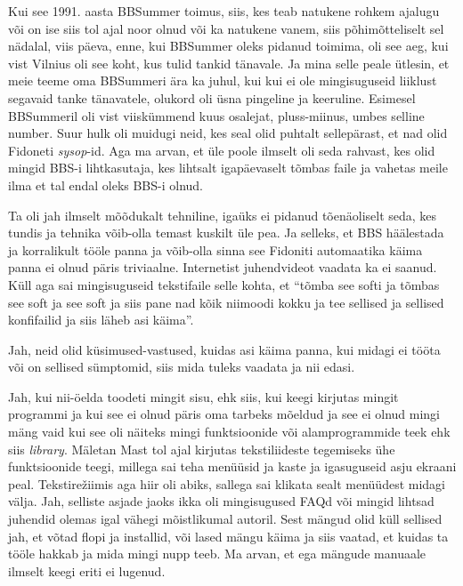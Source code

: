 Kui see 1991. aasta BBSummer toimus, siis, kes teab natukene rohkem ajalugu või on ise siis tol ajal noor olnud või ka natukene vanem, siis põhimõtteliselt sel nädalal,  viis päeva, enne, kui BBSummer oleks pidanud toimima, oli see aeg, kui vist Vilnius oli see koht, kus tulid tankid tänavale. Ja mina selle peale ütlesin, et  meie teeme oma BBSummeri ära ka juhul, kui kui ei ole mingisuguseid liiklust segavaid tanke tänavatele, olukord oli üsna pingeline ja keeruline. Esimesel BBSummeril oli vist viiskümmend kuus osalejat, pluss-miinus, umbes selline number. Suur hulk oli muidugi neid, kes seal olid puhtalt  sellepärast, et nad olid Fidoneti \emph{sysop}-id. Aga ma arvan, et  üle poole ilmselt oli seda rahvast, kes  olid mingid BBS-i lihtkasutaja, kes lihtsalt igapäevaselt tõmbas faile ja vahetas meile ilma et tal endal oleks BBS-i olnud.


Ta oli jah ilmselt mõõdukalt tehniline, igaüks ei pidanud tõenäoliselt seda, kes tundis ja tehnika võib-olla temast kuskilt üle pea. Ja selleks, et BBS häälestada ja korralikult tööle panna ja võib-olla sinna see Fidoniti automaatika käima panna  ei olnud päris triviaalne. Internetist juhendvideot vaadata ka ei saanud. Küll aga sai mingisuguseid tekstifaile  selle kohta, et \enquote{tõmba see softi ja tõmbas see soft ja see soft ja siis pane nad kõik niimoodi kokku ja  tee sellised ja sellised konfifailid ja siis läheb asi käima}.


Jah, neid  olid küsimused-vastused, kuidas asi käima panna, kui midagi ei tööta või on sellised sümptomid, siis mida tuleks vaadata ja nii edasi.


Jah, kui nii-öelda toodeti mingit sisu, ehk siis, kui keegi kirjutas mingit programmi ja kui see ei olnud  päris oma tarbeks mõeldud ja see ei olnud mingi mäng vaid kui see oli näiteks mingi funktsioonide või alamprogrammide teek ehk siis \emph{library}. Mäletan Mast tol ajal kirjutas tekstiliideste tegemiseks ühe funktsioonide teegi, millega sai teha menüüsid ja kaste ja igasuguseid asju ekraani peal. Tekstirežiimis aga hiir oli  abiks, sallega sai klikata sealt menüüdest midagi välja. Jah, selliste asjade jaoks ikka oli mingisugused FAQd või mingid lihtsad juhendid olemas igal vähegi mõistlikumal autoril. Sest mängud olid küll sellised jah, et võtad flopi ja installid, või lased mängu käima ja siis vaatad, et kuidas ta tööle hakkab ja mida mingi nupp teeb. Ma arvan, et ega mängude manuaale ilmselt keegi eriti ei lugenud.

